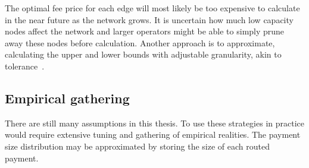 The optimal fee price for each edge will most likely be too expensive to calculate in the near future as the network grows. It is uncertain how much low capacity \gls{node}s affect the network and larger operators might be able to simply prune away these nodes before calculation. Another approach is to approximate, calculating the upper and lower bounds with adjustable granularity, akin to tolerance~\cite{goldengorin:jager:tolerance}. 

\subsection{Empirical gathering}

There are still many assumptions in this thesis. To use these strategies in practice would require extensive tuning and gathering of empirical realities. The payment size distribution may be approximated by storing the size of each routed payment. 


